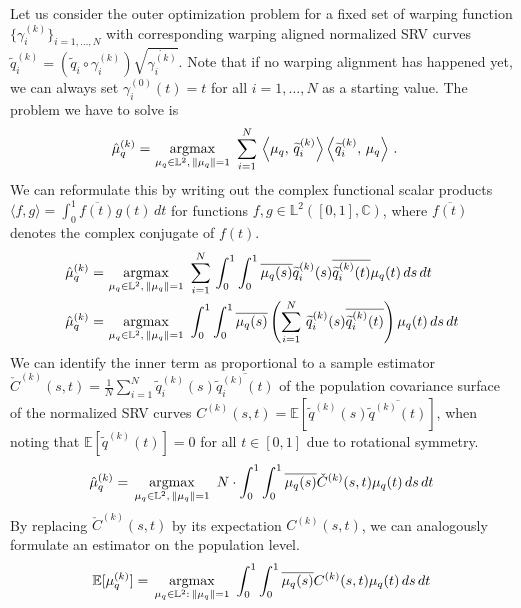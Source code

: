 Let us consider the outer optimization problem for a fixed set of warping function $\{\gamma_i^{(k)}\}_{i=1,\dots,N}$ with corresponding warping aligned normalized SRV curves $\widetilde q_i^{(k)} = ( \widetilde q_i \circ \gamma_i^{(k)}) \sqrt{\dot{\gamma_i^{(k)}}}$.
Note that if no warping alignment has happened yet, we can always set $\gamma_i^{(0)}(t) = t$ for all $i=1,\dots,N$ as a starting value.
The problem we have to solve is
\begin{align}
  \hat\mu_q^{(k)} = &\, \operatorname*{argmax}_{\mu_q \in \mathbb{L}^2,\,\lVert\mu_q\rVert = 1}\,\,
    \sum_{i=1}^N \, \left\langle \mu_q,\, \widetilde q_i^{(k)} \right\rangle \left\langle \widetilde q_i^{(k)},\, \mu_q \right\rangle\,.
\end{align}
We can reformulate this by writing out the complex functional scalar products $\langle f, g \rangle = \int_0^1 \overline{f(t)} g(t) \, dt$ for functions $f,g \in \mathbb{L}^2([0,1], \mathbb{C})$, where $\overline{f(t)}$ denotes the complex conjugate of $f(t)$.
\begin{align}
  \hat\mu_q^{(k)} = &\, \operatorname*{argmax}_{\mu_q \in \mathbb{L}^2,\,\lVert\mu_q\rVert = 1}\,\,
    \sum_{i=1}^N \, \int_0^1 \int_0^1 \overline{\mu_q (s)} \widetilde q_i^{(k)}(s) \overline{\widetilde q_i^{(k)}(t)} \mu_q(t) \,ds\,dt \\
  \hat\mu_q^{(k)} = &\, \operatorname*{argmax}_{\mu_q \in \mathbb{L}^2,\,\lVert\mu_q\rVert = 1}\,\,
    \int_0^1 \int_0^1 \overline{\mu_q (s)} \left( \sum_{i=1}^N\, \widetilde q_i^{(k)}(s) \overline{ \widetilde q_i^{(k)}(t)} \right) \mu_q(t) \,ds\,dt
\end{align}
We can identify the inner term as proportional to a sample estimator $\check{C}^{(k)}(s,t) = \frac{1}{N} \sum_{i=1}^N \widetilde q_i^{(k)}(s) \overline{\widetilde q_i^{(k)}(t)}$ of the population covariance surface of the normalized SRV curves  $C^{(k)}(s,t) = \mathbb{E}[\widetilde q^{(k)}(s) \overline{\widetilde q^{(k)}(t)}]$, when noting that $\mathbb{E}[\widetilde q^{(k)}(t)] = 0$ for all $t \in [0,1]$ due to rotational symmetry.
\begin{equation}
\hat\mu_q^{(k)} = \, \operatorname*{argmax}_{\mu_q \in \mathbb{L}^2,\,\lVert\mu_q\rVert = 1}\,\,
    N\cdot\int_0^1 \int_0^1 \overline{\mu_q (s)} \check C^{(k)}(s,t) \mu_q(t) \,ds\,dt
\end{equation}
By replacing $\check C^{(k)}(s,t)$ by its expectation  $C^{(k)}(s,t)$, we can analogously formulate an estimator on the population level.
\begin{equation}
  \mathbb{E}[\mu_q^{(k)}] = \, \operatorname*{argmax}_{\mu_q \in \mathbb{L}^2:\,\lVert\mu_q\rVert = 1}\,\,
    \int_0^1 \int_0^1 \overline{\mu_q (s)} C^{(k)}(s,t) \mu_q(t) \,ds\,dt
\end{equation}
